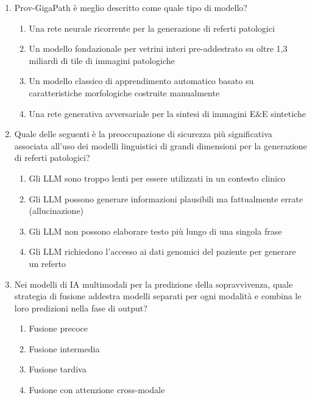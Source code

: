\begin{enumerate}
  \item \label{ch4:q7} Prov-GigaPath è meglio descritto come quale tipo di modello?
  \begin{enumerate}[label=\Alph*.]
    \item Una rete neurale ricorrente per la generazione di referti patologici
    \item Un modello fondazionale per vetrini interi pre-addestrato su oltre 1,3 miliardi di tile di immagini patologiche
    \item Un modello classico di apprendimento automatico basato su caratteristiche morfologiche costruite manualmente
    \item Una rete generativa avversariale per la sintesi di immagini E\&E sintetiche
  \end{enumerate}

  \item \label{ch4:q8} Quale delle seguenti è la preoccupazione di sicurezza più significativa associata all'uso dei modelli linguistici di grandi dimensioni per la generazione di referti patologici?
  \begin{enumerate}[label=\Alph*.]
    \item Gli LLM sono troppo lenti per essere utilizzati in un contesto clinico
    \item Gli LLM possono generare informazioni plausibili ma fattualmente errate (allucinazione)
    \item Gli LLM non possono elaborare testo più lungo di una singola frase
    \item Gli LLM richiedono l'accesso ai dati genomici del paziente per generare un referto
  \end{enumerate}

  \item \label{ch4:q9} Nei modelli di IA multimodali per la predizione della sopravvivenza, quale strategia di fusione addestra modelli separati per ogni modalità e combina le loro predizioni nella fase di output?
  \begin{enumerate}[label=\Alph*.]
    \item Fusione precoce
    \item Fusione intermedia
    \item Fusione tardiva
    \item Fusione con attenzione cross-modale
  \end{enumerate}


\end{enumerate}
